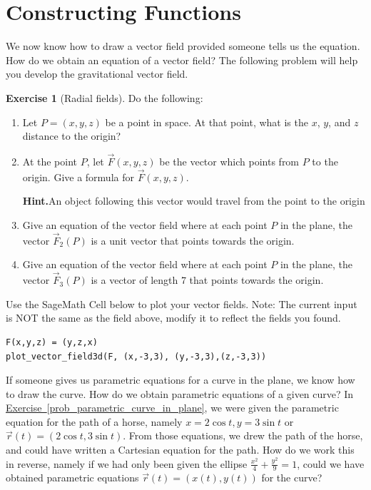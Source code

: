 \documentclass[10pt,]{book}
\theoremstyle{plain}
\theoremstyle{definition}
\theoremstyle{definition}
\theoremstyle{definition}
\theoremstyle{definition}
\newtheorem{exploration}[project]{Exercise}
\theoremstyle{definition}
\numberwithin{equation}{section}
\newcommand{\ds}{\displaystyle}
\begin{document}
\section[{Constructing Functions}]{Constructing Functions}\label{ch06_05_functions}
We now know how to draw a vector field provided someone tells us the equation. How do we obtain an equation of a vector field? The following problem will help you develop the gravitational vector field.%
\begin{exploration}[Radial fields]\label{exploration-121}
Do the following:%
\begin{enumerate}[font=\bfseries,label=(\alph*),ref=\alph*]
\item\label{task-240} Let \(P=(x,y,z)\) be a point in space. At that point, what is the \(x\), \(y\), and \(z\) distance to the origin?%
\item\label{task-241} At the point \(P\), let \(\vec F(x,y,z)\) be the vector which points from \(P\) to the origin.  Give a formula for \(\vec F(x,y,z)\).%
\par\medskip\noindent%
\textbf{Hint.}\quad An object following this vector would travel from the point to the origin%
\item\label{task-242} Give an equation of the vector field where at each point \(P\) in the plane, the vector \(\vec F_2(P)\) is a unit vector that points towards the origin.%
\item\label{task-243} Give an equation of the vector field where at each point \(P\) in the plane, the vector \(\vec F_3(P)\) is a vector of length 7 that points towards the origin.%
\end{enumerate}
\bigbreak
Use the SageMath Cell below to plot your vector fields. Note: The current input is NOT the same as the field above, modify it to reflect the fields you found.%
\begin{lstlisting}[style=sageinput]
F(x,y,z) = (y,z,x)
plot_vector_field3d(F, (x,-3,3), (y,-3,3),(z,-3,3))
\end{lstlisting}
\end{exploration}
If someone gives us parametric equations for a curve in the plane, we know how to draw the curve. How do we obtain parametric equations of a given curve? In \hyperref[prob_parametric_curve_in_plane]{Exercise~\ref{prob_parametric_curve_in_plane}}, we were given the parametric equation for the path of a horse, namely \(x=2\cos t, y=3 \sin t\) or \(\vec r(t)=(2\cos t,3\sin t)\). From those equations, we drew the path of the horse, and could have written a Cartesian equation for the path. How do we work this in reverse, namely if we had only been given the ellipse \(\ds\frac{x^2}{4}+\frac{y^2}{9}=1\), could we have obtained parametric equations \(\vec r(t)=(x(t),y(t))\) for the curve?%
\end{document}
